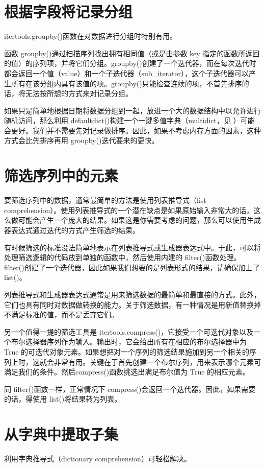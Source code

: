 \section{根据字段将记录分组}
itertools.groupby()函数在对数据进行分组时特别有用。

函数 groupby()通过扫描序列找出拥有相同值（或是由参数 key 指定的函数所返回的值）的序列项，并将它们分组。groupby()创建了一个迭代器，而在每次迭代时都会返回一个值（value）和一个子迭代器（sub\_iterator），这个子迭代器可以产生所有在该分组内具有该值的项。groupby()只能检查连续的项，不首先排序的话，将无法按所想的方式来对记录分组。

如果只是简单地根据日期将数据分组到一起，放进一个大的数据结构中以允许进行随机访问，那么利用 defaultdict()构建一个一键多值字典（multidict，见 ）可能会更好。我们并不需要先对记录做排序。因此，如果不考虑内存方面的因素，这种方式会比先排序再用 groupby()迭代要来的更快。

\section{筛选序列中的元素}
要筛选序列中的数据，通常最简单的方法是使用列表推导式（list comprehension）。使用列表推导式的一个潜在缺点是如果原始输入非常大的话，这么做可能会产生一个庞大的结果。如果这是你需要考虑的问题，那么可以使用生成器表达式通过迭代的方式产生筛选的结果。

有时候筛选的标准没法简单地表示在列表推导式或生成器表达式中。于此，可以将处理筛选逻辑的代码放到单独的函数中，然后使用内建的 filter()函数处理。filter()创建了一个迭代器，因此如果我们想要的是列表形式的结果，请确保加上了 list()。

列表推导式和生成器表达式通常是用来筛选数据的最简单和最直接的方式。此外，它们也具有同时对数据做转换的能力。关于筛选数据，有一种情况是用新值替换掉不满足标准的值，而不是丢弃它们。

另一个值得一提的筛选工具是 itertools.compress()，它接受一个可迭代对象以及一个布尔选择器序列作为输入。输出时，它会给出所有在相应的布尔选择器中为 True 的可迭代对象元素。如果想把对一个序列的筛选结果施加到另一个相关的序列上时，这就会非常有用。关键在于首先创建一个布尔序列，用来表示哪个元素可满足我们的条件。然后compress()函数挑选出满足布尔值为 True 的相应元素。

同 filter()函数一样，正常情况下 compress()会返回一个迭代器。因此，如果需要的话，得使用 list()将结果转为列表。

\section{从字典中提取子集}
利用字典推导式（dictionary comprehension）可轻松解决。
